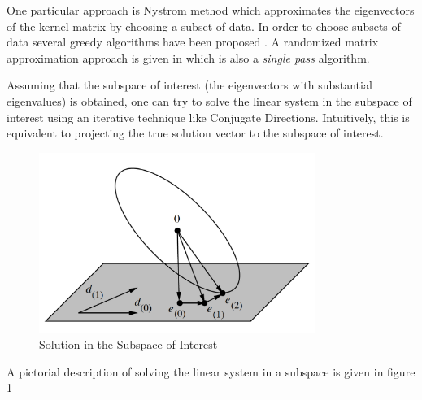 \documentclass{article}
\begin{document}
One particular approach is Nystrom method which approximates the eigenvectors of the kernel matrix by choosing a subset of data. In order to choose subsets of data several greedy algorithms have been proposed \cite{rasmussen} \cite{smolaGreedy}. A randomized matrix approximation approach is given in \cite{RandomizedMatrixDecompose} which is also a \textit{single pass} algorithm. 

Assuming that the subspace of interest (the eigenvectors with substantial eigenvalues) is obtained, one can try to solve the linear system in the subspace of interest using an iterative technique like Conjugate Directions. Intuitively, this is equivalent to projecting the true solution vector to the subspace of interest.
\begin{figure}[h!] \label{fig:subspace}
  \caption{Solution in the Subspace of Interest}
  \centering
    \includegraphics[width=0.8\textwidth]{subspace}
\end{figure}
A pictorial description of solving the linear system in a subspace is given in figure \ref{fig:subspace}
\end{document}
